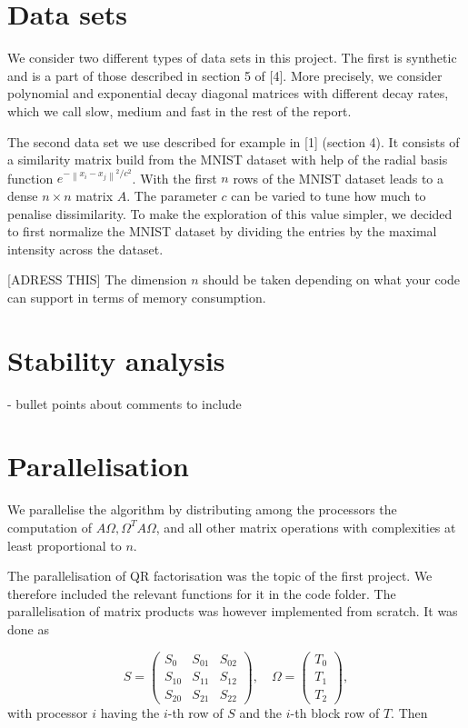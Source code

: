 \documentclass[a4paper, 12pt,oneside]{article}
\begin{document}
	\section{Data sets}
	We consider two different types of data sets in this project. The first is synthetic and is a part of those described in section 5 of [4]. More precisely, we consider polynomial and exponential decay diagonal matrices with different decay rates, which we call slow, medium and fast in the rest of the report.
	
	The second data set we use  described for example in [1] (section 4). It consists of a similarity matrix build from the MNIST dataset with help of the radial basis function $e^{-\left\|x_i-x_j\right\|^2 / c^2}$. With the first $n$ rows of the MNIST dataset leads to a dense $n\times n$ matrix $A$. The parameter $c$ can be varied to tune how much to penalise dissimilarity. To make the exploration of this value simpler, we decided to first normalize the MNIST dataset by dividing the entries by the maximal intensity across the dataset. 
	
	[ADRESS THIS] The dimension $n$ should be taken depending on what your code can support in terms of memory consumption.
	\section{Stability analysis}
		- bullet points about comments to include 
	\section{Parallelisation}
	We parallelise the algorithm by distributing among the processors the computation of $A \Omega,\Omega^T A \Omega$, and all other matrix operations with complexities at least proportional to $n$. 
	
	The parallelisation of QR factorisation was the topic of the first project. We therefore included the relevant functions for it in the code folder. The parallelisation of matrix products was however implemented from scratch. It was done as 	
	
	$$
	S=\left(\begin{array}{lll}
	S_{0} & S_{01} & S_{02} \\
	S_{10} & S_{11} & S_{12} \\
	S_{20} & S_{21} & S_{22}
	\end{array}\right), \quad \Omega=\left(\begin{array}{l}
	T_0 \\
	T_1 \\
	T_2
	\end{array}\right),
	$$
	with processor $i$ having the $i$-th row of $S$ and the $i$-th block row of $T$. Then
\end{document}

